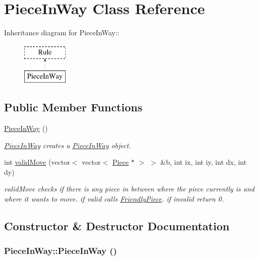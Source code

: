 \hypertarget{classPieceInWay}{
\section{PieceInWay Class Reference}
\label{classPieceInWay}
}
Inheritance diagram for PieceInWay::\begin{figure}[H]
\begin{center}
\leavevmode
\includegraphics[height=2cm]{classPieceInWay}
\end{center}
\end{figure}
\subsection*{Public Member Functions}
\begin{DoxyCompactItemize}
\item 
\hyperlink{classPieceInWay_a9e3ba0268de2c0dde0d4ca047050020f}{PieceInWay} ()
\begin{DoxyCompactList}\small\item\em \hyperlink{classPieceInWay}{PieceInWay} creates a \hyperlink{classPieceInWay}{PieceInWay} object. \item\end{DoxyCompactList}\item 
int \hyperlink{classPieceInWay_a9b34a28e7b7b7ff310f5998ff5f49fb6}{validMove} (vector$<$ vector$<$ \hyperlink{classPiece}{Piece} $\ast$ $>$ $>$ \&b, int ix, int iy, int dx, int dy)
\begin{DoxyCompactList}\small\item\em validMove checks if there is any piece in between where the piece currently is and where it wants to move. if valid calls \hyperlink{classFriendlyPiece}{FriendlyPiece}. if invalid return 0. \item\end{DoxyCompactList}\end{DoxyCompactItemize}


\subsection{Constructor \& Destructor Documentation}
\hypertarget{classPieceInWay_a9e3ba0268de2c0dde0d4ca047050020f}{
\subsubsection[{PieceInWay}]{\setlength{\rightskip}{0pt plus 5cm}PieceInWay::PieceInWay ()}}
\label{classPieceInWay_a9e3ba0268de2c0dde0d4ca047050020f}


